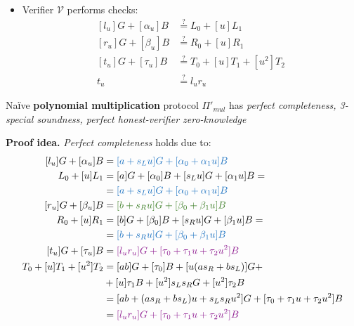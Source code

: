 \documentclass[../lecture-notes-148x210.tex]{subfiles}
\begin{document}
\begin{itemize}
\begin{equation}
            \begin{aligned}
                l_u & = a + s_L u & \alpha_u &= \alpha_0 + \alpha_1 u\\
                r_u &= b + s_R u & \beta_u &= \beta_0 + \beta_1 u\\
                t_u &= l_u r_u & \tau_u &= \tau_0 + \tau_1 u + \tau_2 u^2
            \end{aligned}
        \end{equation}
        and sends $(l_u, r_u, t_u, \alpha_u, \beta_u, \tau_u)$ to $\mathcal{V}$.
    \item Verifier $\mathcal{V}$ performs checks: 
        \begin{equation}
            \begin{aligned}
                [l_u]G + [\alpha_u]B &\stackrel{\text{?}}{=} L_0 + [u]L_1 \\
                [r_u]G + [\beta_u]B &\stackrel{\text{?}}{=} R_0 + [u]R_1 \\
                [t_u]G + [\tau_u]B &\stackrel{\text{?}}{=} T_0 + [u]T_1 + [u^2]T_2 \\
                t_u &\stackrel{\text{?}}{=} l_u r_u
            \end{aligned}
        \end{equation}
\end{itemize}
\begin{theorem}
    Naїve \textbf{polynomial multiplication} protocol $\Pi'_{mul}$ has \textit{perfect completeness, 3-special soundness, perfect honest-verifier zero-knowledge}
    \label{th:poly_mul_naive}
\end{theorem}
\textbf{Proof idea.} \textit{Perfect completeness} holds due to:
\begin{equation*}
    \begin{aligned} %
        [l_u]G + [\alpha_u]B &= \textcolor{RoyalBlue}{[a + s_L u]G + [\alpha_0 + \alpha_1 u]B} \\
        L_0 + [u]L_1 &= [a]G + [\alpha_0]B + [s_L u]G + [\alpha_1 u]B = \\
        &= \textcolor{RoyalBlue}{[a + s_L u]G + [\alpha_0 + \alpha_1 u]B} \\
        [r_u]G + [\beta_u]B &= \textcolor{OliveGreen}{[b + s_R u]G + [\beta_0 + \beta_1 u]B} \\
        R_0 + [u]R_1 &= [b]G + [\beta_0]B + [s_R u]G + [\beta_1 u]B = \\ 
        &= \textcolor{RoyalBlue}{[b + s_R u]G + [\beta_0 + \beta_1 u]B}\\
        [t_u]G + [\tau_u]B &= \textcolor{Plum}{[l_u r_u]G + [\tau_0 + \tau_1 u + \tau_2 u^2]B} \\
        T_0 + [u]T_1 + [u^2]T_2 &= [ab]G + [\tau_0]B + [u(as_R + bs_L)]G + \\
        &+[u]\tau_1 B + [u^2]s_L s_R G + [u^2]\tau_2 B \\
            &= [ab + (as_R + bs_L)u + s_L s_R u^2]G + [\tau_0 + \tau_1 u + \tau_2 u^2]B \\
            &= \textcolor{Plum}{[l_u r_u]G + [\tau_0 + \tau_1 u + \tau_2 u^2]B}
    \end{aligned}
\end{equation*}
\end{document}
